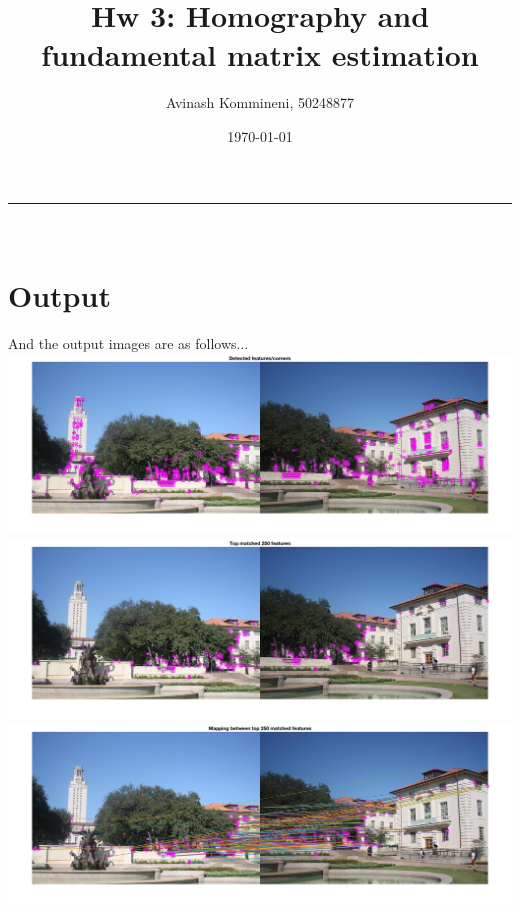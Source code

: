 \documentclass[a4paper,11pt]{article}
\makeatletter
\newcommand{\linia}{\rule{\linewidth}{0.5pt}}
\renewcommand{\maketitle}{
\begin{center}
\vspace{1ex}
{\LARGE \textsc{\@title}}
\vspace{0.5ex}
\linia\\
\@author \hfill \@date
\vspace{3ex}
\end{center}
}
\makeatother
\begin{document}
\title{Hw 3: Homography and fundamental matrix estimation}

\author{Avinash Kommineni, 50248877} 
\date{\today}

\maketitle

\section*{Output}

And the output images are as follows...\\
\includegraphics[width=\textwidth]{hw3/code/1}\\
\includegraphics[width=\textwidth]{hw3/code/2}\\
\includegraphics[width=\textwidth]{hw3/code/3}\\
\end{document}
